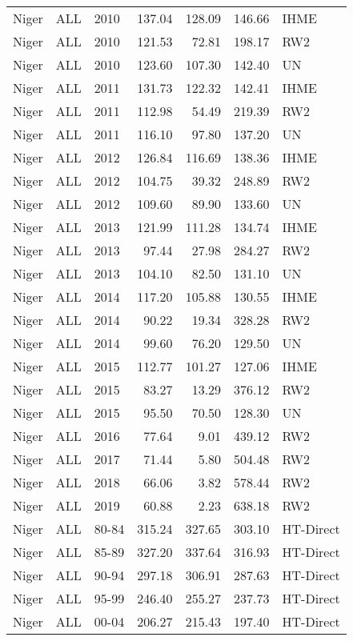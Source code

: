 \begin{longtable}{lllrrrl}
  Niger & ALL & 2010 & 137.04 & 128.09 & 146.66 & IHME \\ 
  Niger & ALL & 2010 & 121.53 & 72.81 & 198.17 & RW2 \\ 
  Niger & ALL & 2010 & 123.60 & 107.30 & 142.40 & UN \\ 
  Niger & ALL & 2011 & 131.73 & 122.32 & 142.41 & IHME \\ 
  Niger & ALL & 2011 & 112.98 & 54.49 & 219.39 & RW2 \\ 
  Niger & ALL & 2011 & 116.10 & 97.80 & 137.20 & UN \\ 
  Niger & ALL & 2012 & 126.84 & 116.69 & 138.36 & IHME \\ 
  Niger & ALL & 2012 & 104.75 & 39.32 & 248.89 & RW2 \\ 
  Niger & ALL & 2012 & 109.60 & 89.90 & 133.60 & UN \\ 
  Niger & ALL & 2013 & 121.99 & 111.28 & 134.74 & IHME \\ 
  Niger & ALL & 2013 & 97.44 & 27.98 & 284.27 & RW2 \\ 
  Niger & ALL & 2013 & 104.10 & 82.50 & 131.10 & UN \\ 
  Niger & ALL & 2014 & 117.20 & 105.88 & 130.55 & IHME \\ 
  Niger & ALL & 2014 & 90.22 & 19.34 & 328.28 & RW2 \\ 
  Niger & ALL & 2014 & 99.60 & 76.20 & 129.50 & UN \\ 
  Niger & ALL & 2015 & 112.77 & 101.27 & 127.06 & IHME \\ 
  Niger & ALL & 2015 & 83.27 & 13.29 & 376.12 & RW2 \\ 
  Niger & ALL & 2015 & 95.50 & 70.50 & 128.30 & UN \\ 
  Niger & ALL & 2016 & 77.64 & 9.01 & 439.12 & RW2 \\ 
  Niger & ALL & 2017 & 71.44 & 5.80 & 504.48 & RW2 \\ 
  Niger & ALL & 2018 & 66.06 & 3.82 & 578.44 & RW2 \\ 
  Niger & ALL & 2019 & 60.88 & 2.23 & 638.18 & RW2 \\ 
  Niger & ALL & 80-84 & 315.24 & 327.65 & 303.10 & HT-Direct \\ 
  Niger & ALL & 85-89 & 327.20 & 337.64 & 316.93 & HT-Direct \\ 
  Niger & ALL & 90-94 & 297.18 & 306.91 & 287.63 & HT-Direct \\ 
  Niger & ALL & 95-99 & 246.40 & 255.27 & 237.73 & HT-Direct \\ 
  Niger & ALL & 00-04 & 206.27 & 215.43 & 197.40 & HT-Direct \\ 

\end{longtable}
